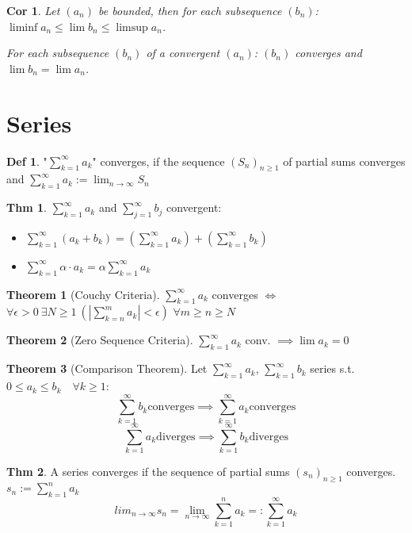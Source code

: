 \documentclass[a4paper, 10pt]{article}
\newtheorem*{corollary}{Cor}
\theoremstyle{definition}
\newtheorem*{theorem}{Thm}
\newtheorem*{definition}{Def}
\theoremstyle{named}
\newtheorem*{ntheorem_wrapper}{Theorem}
\newenvironment{ntheorem}%
    {\begin{mdframed}[style=important]\begin{ntheorem_wrapper}}%
    {\end{ntheorem_wrapper}\end{mdframed}}
\begin{document}
\begin{corollary}
    Let $(a_n)$ be bounded, then for each subsequence $(b_n)$: $\liminf a_n \leq \lim b_n \leq \limsup a_n$.

    For each subsequence $(b_n)$ of a convergent $(a_n)$: $(b_n)$ converges and $\lim b_n = \lim a_n$.
\end{corollary}

\section{Series}
\begin{definition}
    "$\sum_{k=1}^\infty a_k$" converges, if the sequence $(S_n)_{n \geq 1}$ of partial sums converges and $\sum_{k=1}^\infty a_k := \lim_{n \to \infty} S_n$
\end{definition}

\begin{theorem}
    $\sum_{k = 1}^\infty a_k$ and $\sum_{j = 1}^\infty b_j$ convergent:
    \begin{itemize}
        \item $\sum_{k = 1}^\infty (a_k + b_k) = (\sum_{k = 1}^\infty a_k) + (\sum_{k = 1}^\infty b_k)$
        \item $\sum_{k = 1}^\infty \alpha \cdot a_k = \alpha \sum_{k = 1}^\infty a_k$
    \end{itemize}
\end{theorem}

\begin{ntheorem}[Couchy Criteria]
    $\sum_{k = 1}^\infty a_k$ converges $\iff$ $\forall \epsilon > 0 \ \exists N \geq 1 \ (|\sum_{k = n}^m a_k| < \epsilon)$ $\forall m\geq n \geq N$
\end{ntheorem}

\begin{ntheorem}[Zero Sequence Criteria]
    $\sum_{k=1}^\infty a_k$ conv. $\implies \lim a_k = 0$
\end{ntheorem}

\begin{ntheorem}[Comparison Theorem]
    Let $\sum_{k = 1}^\infty a_k$, $\sum_{k = 1}^\infty b_k$ series s.t. $0 \leq a_k \leq b_k \quad \forall k \geq 1$:
    $$\sum_{k=1}^\infty b_k \text{converges} \implies \sum_{k = 1}^\infty a_k \text{converges}$$
    $$\sum_{k = 1}^\infty  a_k \text{diverges} \implies \sum_{k = 1}^\infty  b_k \text{diverges}$$
\end{ntheorem}

\begin{theorem}
    A series converges if the sequence of partial sums $(s_n)_{n \geq 1}$ converges. $s_n := \sum_{k = 1}^n a_k$
    $$lim_{n \to \infty} s_n = \lim_{n \to \infty} \sum_{k = 1}^n a_k =: \sum_{k=1}^\infty a_k$$
\end{theorem}
\end{document}
